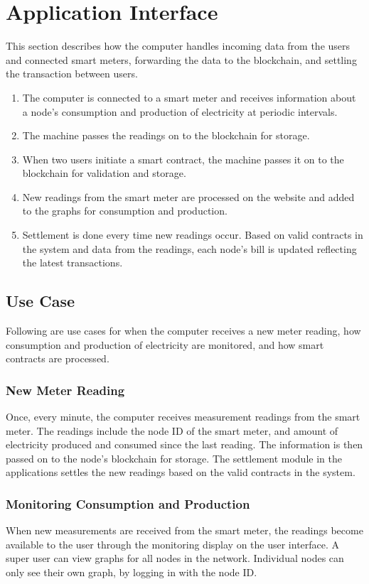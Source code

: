\section{Application Interface} \label{computer}
This section describes how the computer handles incoming data from the users and connected smart meters, forwarding the data to the blockchain, and settling the transaction between users.
\begin{enumerate}
\item The computer is connected to a smart meter and receives information about a node's consumption and production of electricity at periodic intervals. 
\item The machine passes the readings on to the blockchain for storage. 
\item When two users initiate a smart contract, the machine passes it on to the blockchain for validation and storage.
\item New readings from the smart meter are processed on the website and added to the graphs for consumption and production.
\item Settlement is done every time new readings occur. Based on valid contracts in the system and data from the readings, each node's bill is updated reflecting the latest transactions.
\end{enumerate}

\subsection{Use Case}
Following are use cases for when the computer receives a new meter reading, how consumption and production of electricity are monitored, and how smart contracts are processed. 
\subsubsection*{New Meter Reading}
Once, every minute, the computer receives measurement readings from the smart meter. The readings include the node ID of the smart meter, and amount of electricity produced and consumed since the last reading. The information is then passed on to the node's blockchain for storage. The settlement module in the applications settles the new readings based on the valid contracts in the system. 

\subsubsection*{Monitoring Consumption and Production}
When new measurements are received from the smart meter, the readings become available to the user through the monitoring display on the user interface. A super user can view graphs for all nodes in the network. Individual nodes can only see their own graph, by logging in with the node ID.

